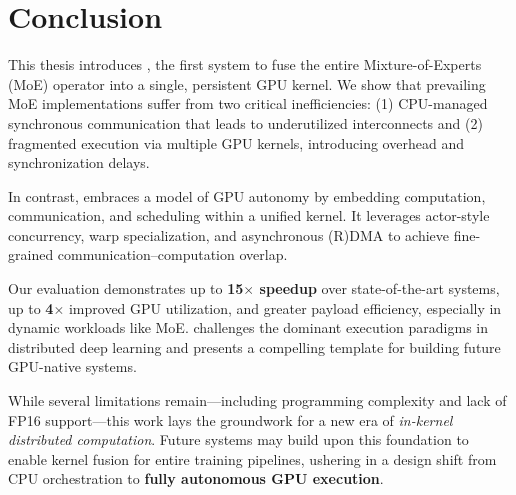 \chapter{Conclusion}\label{ch:conclusion}
This thesis introduces \sysname,
the first system to fuse the entire Mixture-of-Experts (MoE)
operator into a single, persistent GPU kernel.
We show that prevailing MoE implementations
suffer from two critical inefficiencies:
(1) CPU-managed synchronous communication that leads to underutilized
interconnects and (2) fragmented execution via multiple GPU kernels,
introducing overhead and synchronization delays.

In contrast, \sysname embraces a model of
GPU autonomy by embedding computation, communication, and scheduling within a unified kernel.
It leverages actor-style concurrency,
warp specialization, and asynchronous (R)DMA to
achieve fine-grained communication–computation overlap.

Our evaluation demonstrates up to \textbf{15$\times$ speedup}
over state-of-the-art systems, up to  \textbf{4$\times$} improved GPU utilization, and
greater payload efficiency, especially in dynamic workloads like MoE.
\sysname challenges the dominant execution paradigms in distributed deep learning
and presents a compelling template for building future GPU-native systems.

While several limitations remain---including programming complexity and lack of FP16 support---this
work lays the groundwork for a new era of \emph{in-kernel distributed computation}.
Future systems may build upon this foundation to enable kernel fusion for
entire training pipelines, ushering in a design shift from CPU orchestration to
\textbf{fully autonomous GPU execution}.
